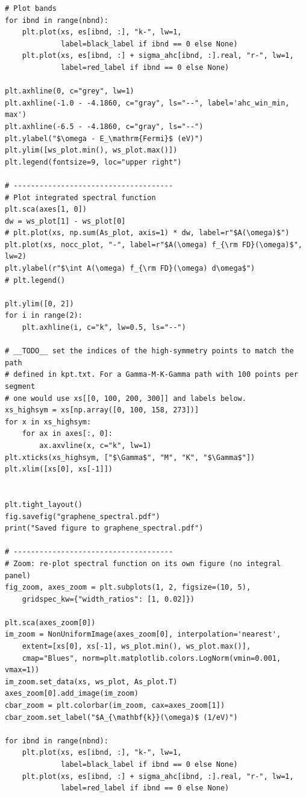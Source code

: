 \documentclass[a4paper,11pt,serif]{article}
\begin{document}
\begin{scriptsize}
\begin{Verbatim}[frame=single]
# Plot bands
for ibnd in range(nbnd):
    plt.plot(xs, es[ibnd, :], "k-", lw=1,
             label=black_label if ibnd == 0 else None)
    plt.plot(xs, es[ibnd, :] + sigma_ahc[ibnd, :].real, "r-", lw=1,
             label=red_label if ibnd == 0 else None)

plt.axhline(0, c="grey", lw=1)
plt.axhline(-1.0 - -4.1860, c="gray", ls="--", label='ahc_win_min, max')
plt.axhline(-6.5 - -4.1860, c="gray", ls="--")
plt.ylabel("$\omega - E_\mathrm{Fermi}$ (eV)")
plt.ylim([ws_plot.min(), ws_plot.max()])
plt.legend(fontsize=9, loc="upper right")

# -------------------------------------
# Plot integrated spectral function
plt.sca(axes[1, 0])
dw = ws_plot[1] - ws_plot[0]
# plt.plot(xs, np.sum(As_plot, axis=1) * dw, label=r"$A(\omega)$")
plt.plot(xs, nocc_plot, "-", label=r"$A(\omega) f_{\rm FD}(\omega)$", lw=2)
plt.ylabel(r"$\int A(\omega) f_{\rm FD}(\omega) d\omega$")
# plt.legend()

plt.ylim([0, 2])
for i in range(2):
    plt.axhline(i, c="k", lw=0.5, ls="--")

# __TODO__ set the indices of the high-symmetry points to match the path
# defined in kpt.txt. For a Gamma-M-K-Gamma path with 100 points per segment
# one would use xs[[0, 100, 200, 300]] and labels below.
xs_highsym = xs[np.array([0, 100, 158, 273])]
for x in xs_highsym:
    for ax in axes[:, 0]:
        ax.axvline(x, c="k", lw=1)
plt.xticks(xs_highsym, ["$\Gamma$", "M", "K", "$\Gamma$"])
plt.xlim([xs[0], xs[-1]])


plt.tight_layout()
fig.savefig("graphene_spectral.pdf")
print("Saved figure to graphene_spectral.pdf")

# -------------------------------------
# Zoom: re-plot spectral function on its own figure (no integral panel)
fig_zoom, axes_zoom = plt.subplots(1, 2, figsize=(10, 5),
    gridspec_kw={"width_ratios": [1, 0.02]})

plt.sca(axes_zoom[0])
im_zoom = NonUniformImage(axes_zoom[0], interpolation='nearest',
    extent=[xs[0], xs[-1], ws_plot.min(), ws_plot.max()],
    cmap="Blues", norm=plt.matplotlib.colors.LogNorm(vmin=0.001, vmax=1))
im_zoom.set_data(xs, ws_plot, As_plot.T)
axes_zoom[0].add_image(im_zoom)
cbar_zoom = plt.colorbar(im_zoom, cax=axes_zoom[1])
cbar_zoom.set_label("$A_{\mathbf{k}}(\omega)$ (1/eV)")

for ibnd in range(nbnd):
    plt.plot(xs, es[ibnd, :], "k-", lw=1,
             label=black_label if ibnd == 0 else None)
    plt.plot(xs, es[ibnd, :] + sigma_ahc[ibnd, :].real, "r-", lw=1,
             label=red_label if ibnd == 0 else None)


\end{Verbatim}
\end{scriptsize}
\end{document}
